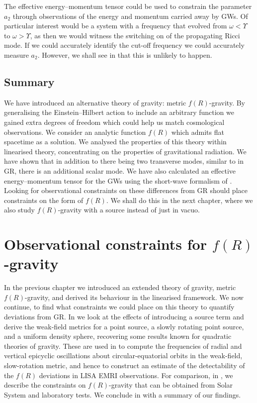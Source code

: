 The effective energy--momentum tensor could be used to constrain the parameter $a_2$ through observations of the energy and momentum carried away by GWs. Of particular interest would be a system with a frequency that evolved from $\omega < \Upsilon$ to $\omega > \Upsilon$, as then we would witness the switching on of the propagating Ricci mode. If we could accurately identify the cut-off frequency we could accurately measure $a_2$. However, we shall see in  that this is unlikely to happen.

\section{Summary}

We have introduced an alternative theory of gravity: metric $f(R)$-gravity. By generalising the Einstein--Hilbert action to include an arbitrary function we gained extra degrees of freedom which could help us match cosmological observations. We consider an analytic function $f(R)$ which admits flat spacetime as a solution. We analysed the properties of this theory within linearised theory, concentrating on the properties of gravitational radiation. We have shown that in addition to there being two transverse modes, similar to in GR, there is an additional scalar mode. We have also calculated an effective energy--momentum tensor for the GWs using the short-wave formalism of \citet{Isaacson1968,Isaacson1968a}. Looking for observational constraints on these differences from GR should place constraints on the form of $f(R)$. We shall do this in the next chapter, where we also study $f(R)$-gravity with a source instead of just in vacuo.


\chapter{Observational constraints for $f(R)$-gravity}\label{ch:f-R2}

In the previous chapter we introduced an extended theory of gravity, metric $f(R)$-gravity, and derived its behaviour in the linearised framework. We now continue, to find what constraints we could place on this theory to quantify deviations from GR. In  we look at the effects of introducing a source term and derive the weak-field metrics for a point source, a slowly rotating point source, and a uniform density sphere, recovering some results known for quadratic theories of gravity. These are used in  to compute the frequencies of radial and vertical epicyclic oscillations about circular-equatorial orbits in the weak-field, slow-rotation metric, and hence to construct an estimate of the detectability of the $f(R)$ deviations in LISA EMRI observations. For comparison, in , we describe the constraints on $f(R)$-gravity that can be obtained from Solar System and laboratory tests. We conclude in  with a summary of our findings.

